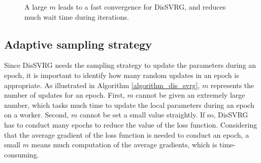 \documentclass[10pt,journal,finalsubmission,compsoc]{IEEEtran}
\begin{document}
\begin{figure}
\centering
{}
\caption{A large $m$ leads to a fast convergence for DisSVRG, and reduces much wait time during iterations.}
\label{figure_evaluation_random_strategy}
\end{figure}

\subsection{Adaptive sampling strategy}

Since DisSVRG needs the sampling strategy to update the parameters during an epoch, it is important to identify how many random updates in an epoch is appropriate.  As illustrated in Algorithm \ref{algorithm_dis_svrg}, $m$ represents the number of updates for an epoch. First, $m$ cannot be given an extremely large number, which tasks much time to update the local parameters during an epoch on a worker.  Second, $m$ cannot be set a small value straightly. If so, DisSVRG has to conduct many epochs to reduce the value of the loss function. Considering that the average gradient of the loss function is needed to conduct an epoch, a small $m$ means much computation of the average gradients, which is time-consuming. 
\end{document}

